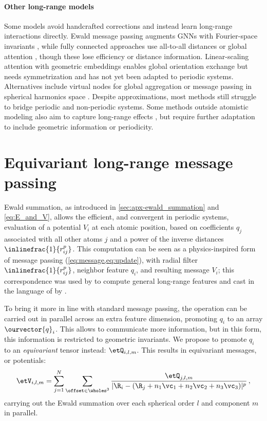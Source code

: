 \documentclass[10pt]{article}
\begin{document}
\paragraph{Other long-range models}
Some models avoid handcrafted corrections and instead learn long-range interactions directly. Ewald message passing augments GNNs with Fourier-space invariants \citep{kggg2023}, while fully connected approaches use all-to-all distances \citep{csmt2018} or global attention \citep{ucgssm2021}, though these lose efficiency or distance information. Linear-scaling attention with geometric embeddings \citep{fcmu2024} enables global orientation exchange but needs symmetrization and has not yet been adapted to periodic systems. Alternatives include virtual nodes for global aggregation \citep{cvgrnc2025} or message passing in spherical harmonics space \citep{fum2022}. Despite approximations, most methods still struggle to bridge periodic and non-periodic systems.
Some methods outside atomistic modeling also aim to capture long-range effects \citep{drgpwlb2022, bgrbd2025, mpxclm2025, zwm2025}, but require further adaptation to include geometric information or periodicity.

\section{Equivariant long-range message passing}
\label{sec:lrmp}


Ewald summation, as introduced in \cref{sec:apx-ewald_summation} and \cref{eq:E_and_V}, allows the efficient, and convergent in periodic systems, evaluation of a potential $V_i$ at each atomic position, based on coefficients $q_j$ associated with all other atoms $j$ and a power of the inverse distances $\inlinefrac{1}{r_{ij}^p}$.
This computation can be seen as a physics-inspired form of message passing (\cref{eq:message,eq:update}), with radial filter $\inlinefrac{1}{r_{ij}^p}$, neighbor feature $q_i$, and resulting message $V_i$; this correspondence was used by \citet{gc2019} to compute general long-range features and cast in the language of \mpnns by \citet{kggg2023}.

To bring it more in line with standard message passing, the operation can be carried out in parallel across an extra feature dimension, promoting $q_i$ to an array $\ourvector{q}_i$. This allows to communicate more information, but in this form, this information is restricted to geometric invariants.
We propose to promote $q_i$ to an \emph{equivariant} tensor instead: $\etQ_{i,l,m}$. This results in equivariant messages, or potentials:
\begin{equation}
  \etV_{i,l,m} = \sum_{j=1}^N \sum_{\offset\in\wholes^3} \frac{\etQ_{j,l,m}}{|\R_i - (\R_j + n_1 \vc_1 + n_2 \vc_2 + n_3 \vc_3 )|^p} \,, \label{eq:Vi_equi}
\end{equation}
carrying out the Ewald summation over each spherical order $l$ and component $m$ in parallel.
\end{document}
